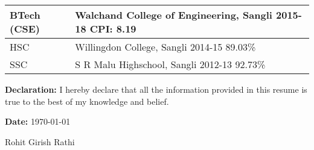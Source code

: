 \documentclass[a4paper,11pt]{article}
\begin{document}
\begin{center}
\begin{minipage}[t]{0.6\textwidth}
\begin{LARGE}
				\begin{tabu} to \textwidth {X[1.15l]X[6l]}
			   		\normalsize BTech (CSE) & {\normalsize Walchand College of Engineering, Sangli} \linebreak \normalsize 2015-18 \hspace{1cm}\normalsize CPI: 8.19\medskip\\
			   		\hline
			   		\normalsize HSC & \normalsize Willingdon College, Sangli \linebreak \normalsize 2014-15 \hspace{1cm}\normalsize 89.03\%\medskip\\
					\hline
				    \normalsize SSC & \normalsize S R Malu Highschool, Sangli \linebreak\normalsize 2012-13 \hspace{1cm}\normalsize 92.73\%\medskip\\
				\end{tabu}
			\end{LARGE}
		\end{minipage}%
		\linebreak\linebreak\linebreak
		\medskip
		\raggedright
		\textbf{Declaration:} I hereby declare that all the information provided in this resume is true to the best of my knowledge and belief.\linebreak\linebreak
		\begin{minipage}[t]{0.5\textwidth}
			\raggedright
			\textbf{Date:} \today
		\end{minipage}%
		\begin{minipage}[t]{0.5\textwidth}
			\raggedleft
			Rohit Girish Rathi
		\end{minipage}%
	\end{center}
\end{document}
